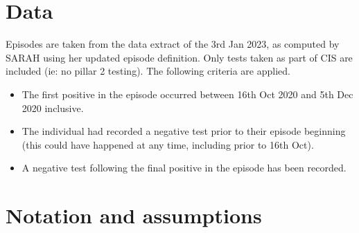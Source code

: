 \documentclass[main.tex]{subfiles}
\begin{document}
\section{Data}\label{data}

Episodes are taken from the data extract of the 3rd Jan 2023, as
computed by SARAH using her updated episode definition. Only tests taken
as part of CIS are included (ie: no pillar 2 testing). The following
criteria are applied.

\begin{itemize}
\item
  The first positive in the episode occurred between 16th Oct 2020 and
  5th Dec 2020 inclusive.
\item
  The individual had recorded a negative test prior to their episode
  beginning (this could have happened at any time, including prior to
  16th Oct).
\item
  A negative test following the final positive in the episode has been
  recorded.
\end{itemize}

\section{Notation and assumptions}\label{notation-and-assumptions}
\end{document}
